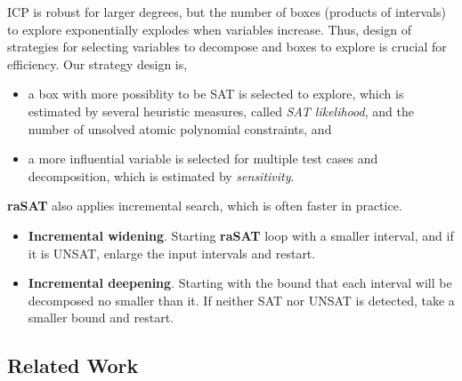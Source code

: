 \documentclass[runningheads,a4paper,oribibl]{llncs}
\begin{document}
ICP is robust for larger degrees, but the number of boxes (products of intervals) to explore 
exponentially explodes when variables increase. 
Thus, design of strategies for selecting variables to decompose and boxes to explore is crucial 
for efficiency. Our strategy design is, 
\begin{itemize}
\item a box with more possiblity to be SAT is selected to explore, which is estimated by 
several heuristic measures, called {\em SAT likelihood}, 
and the number of unsolved atomic polynomial constraints, and
\item a more influential variable is selected for multiple test cases and decomposition, 
which is estimated by {\em sensitivity}. 
\end{itemize} 
{\bf raSAT} also applies incremental search, which is often faster in practice. 
\begin{itemize}
\item {\bf Incremental widening}. 
Starting {\bf raSAT} loop with a smaller interval, and if it is UNSAT, enlarge the input intervals
and restart. 
\item {\bf Incremental deepening}. 
Starting with the bound that each interval will be decomposed no smaller than it. 
If neither SAT nor UNSAT is detected, take a smaller bound and restart. 
\end{itemize} 

\subsection*{Related Work} \label{sec:relate}
\end{document}
